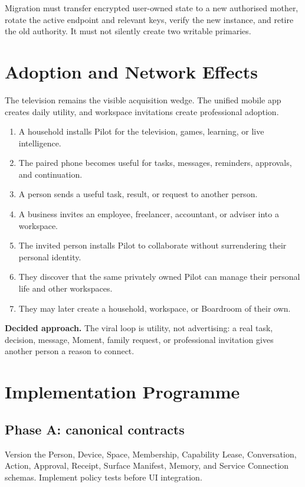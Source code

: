 \documentclass[11pt,a4paper]{article}
\newcommand{\decision}[1]{%
  \par\medskip\noindent
  \colorbox{pilotblue!9}{\parbox{0.94\linewidth}{\textbf{Decided approach.} #1}}%
  \par\medskip}
\begin{document}
Migration must transfer encrypted user-owned state to a new authorised mother,
rotate the active endpoint and relevant keys, verify the new instance, and
retire the old authority.  It must not silently create two writable primaries.

\section{Adoption and Network Effects}

The television remains the visible acquisition wedge.  The unified mobile app
creates daily utility, and workspace invitations create professional adoption.

\begin{enumerate}[leftmargin=*]
  \item A household installs Pilot for the television, games, learning, or live intelligence.
  \item The paired phone becomes useful for tasks, messages, reminders, approvals, and continuation.
  \item A person sends a useful task, result, or request to another person.
  \item A business invites an employee, freelancer, accountant, or adviser into a workspace.
  \item The invited person installs Pilot to collaborate without surrendering their personal identity.
  \item They discover that the same privately owned Pilot can manage their personal life and other workspaces.
  \item They may later create a household, workspace, or Boardroom of their own.
\end{enumerate}

\decision{The viral loop is utility, not advertising: a real task, decision,
message, Moment, family request, or professional invitation gives another
person a reason to connect.}

\section{Implementation Programme}

\subsection{Phase A: canonical contracts}

Version the Person, Device, Space, Membership, Capability Lease, Conversation,
Action, Approval, Receipt, Surface Manifest, Memory, and Service Connection
schemas.  Implement policy tests before UI integration.
\end{document}
